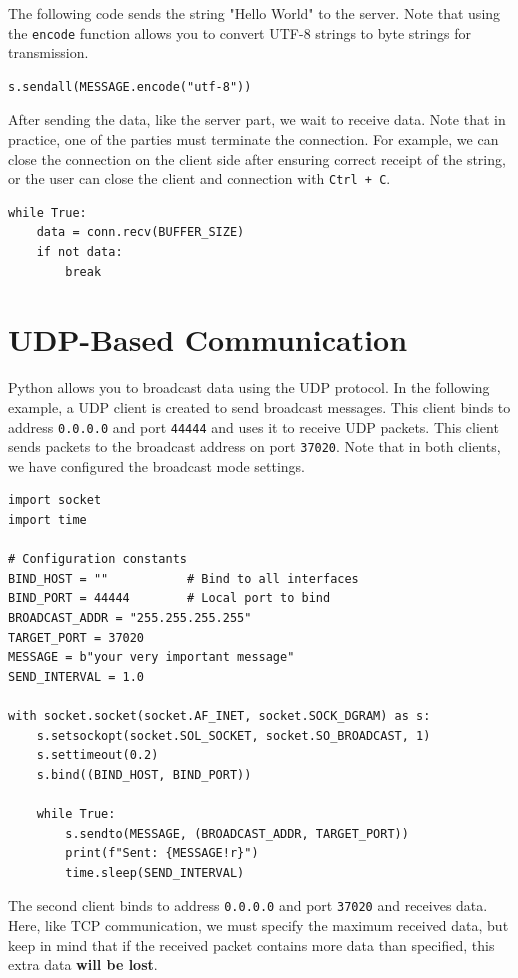 \documentclass[]{article}
\begin{document}
  The following code sends the string "Hello World" to the server. Note that using the \texttt{encode} function allows you to convert UTF-8 strings to byte strings for transmission.

  \begin{verbatim}
s.sendall(MESSAGE.encode("utf-8"))
  \end{verbatim}

  After sending the data, like the server part, we wait to receive data. Note that in practice, one of the parties must terminate the connection.
  For example, we can close the connection on the client side after ensuring correct receipt of the string, or the user can close the client and connection with \texttt{Ctrl + C}.

  \begin{verbatim}
while True:
    data = conn.recv(BUFFER_SIZE)
    if not data:
        break
  \end{verbatim}

  \section{UDP-Based Communication}
  Python allows you to broadcast data using the UDP protocol.
  In the following example, a UDP client is created to send broadcast messages.
  This client binds to address \texttt{0.0.0.0} and port \texttt{44444} and uses it to receive UDP packets.
  This client sends packets to the broadcast address on port \texttt{37020}.
  Note that in both clients, we have configured the broadcast mode settings.

  \begin{verbatim}
import socket
import time

# Configuration constants
BIND_HOST = ""           # Bind to all interfaces
BIND_PORT = 44444        # Local port to bind
BROADCAST_ADDR = "255.255.255.255"
TARGET_PORT = 37020
MESSAGE = b"your very important message"
SEND_INTERVAL = 1.0

with socket.socket(socket.AF_INET, socket.SOCK_DGRAM) as s:
    s.setsockopt(socket.SOL_SOCKET, socket.SO_BROADCAST, 1)
    s.settimeout(0.2)
    s.bind((BIND_HOST, BIND_PORT))

    while True:
        s.sendto(MESSAGE, (BROADCAST_ADDR, TARGET_PORT))
        print(f"Sent: {MESSAGE!r}")
        time.sleep(SEND_INTERVAL)
  \end{verbatim}

  The second client binds to address \texttt{0.0.0.0} and port \texttt{37020} and receives data.
  Here, like TCP communication, we must specify the maximum received data, but keep in mind that if the received packet contains more data than specified, this extra data \textbf{will be lost}.
\end{document}
